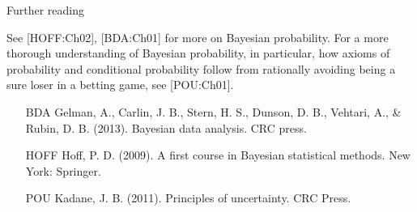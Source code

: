 \begin{frame}{Further reading}

See [HOFF:Ch02], [BDA:Ch01] for more on Bayesian probability. For a more thorough understanding of Bayesian probability, in particular, how axioms of probability and conditional probability follow from rationally avoiding being a sure loser in a betting game, see [POU:Ch01].

\bigskip

\begin{scriptsize}
\begin{itemize}
\item[BDA] Gelman, A., Carlin, J. B., Stern, H. S., Dunson, D. B., Vehtari, A., \& Rubin, D. B. (2013). Bayesian data analysis. CRC press.
\item[HOFF] Hoff, P. D. (2009). A first course in Bayesian statistical methods. New York: Springer.
\item [POU] Kadane, J. B. (2011). Principles of uncertainty. CRC Press.
\end{itemize}
\end{scriptsize}
\end{frame}


